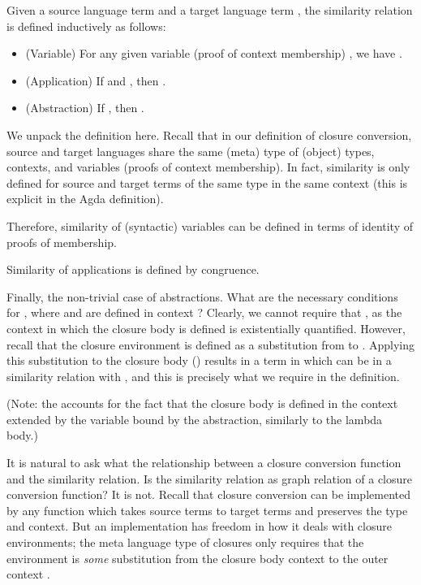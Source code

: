 \begin{definition}
  Given a source language term  and a target language term ,
  the similarity relation  is defined inductively as
  follows:

  \begin{itemize}
  \item
    (Variable) For any given variable (proof of context membership) , we have
    .

  \item
    (Application) If  and ,
    then .

  \item
    (Abstraction) If ,
    then .
  \end{itemize}
\end{definition}

We unpack the definition here. Recall that in our definition of
closure conversion, source and target languages share the same (meta)
type of (object) types, contexts, and variables (proofs of context
membership). In fact, similarity is only defined for source and target
terms of the same type in the same context (this is explicit in the Agda
definition). 

Therefore, similarity of (syntactic) variables can be defined in terms
of identity of proofs of membership.

Similarity of applications is defined by congruence.

Finally, the non-trivial case of abstractions. What are the necessary
conditions for , where  and 
 are defined in context ? Clearly, we cannot require
that , as the context  in which the closure body is
defined is existentially quantified. However, recall that the closure environment
 is defined as a substitution from  to . Applying
this substitution to the closure body ()
results in a term in  which can be in a similarity relation with
, and this is precisely what we require in the definition.

(Note: the  accounts for the fact that the closure body is
defined in the context  extended by the variable bound by the
abstraction, similarly to the lambda body.)

It is natural to ask what the relationship between a closure
conversion function and the similarity relation. Is the similarity
relation as graph relation of a closure conversion function? It is
not. Recall that closure conversion can be implemented by any function
which takes source terms to target terms and preserves the type and
context. But an implementation has freedom in how it deals with
closure environments; the meta language type of closures only requires
that the environment is \textit{some} substitution from the closure
body context  to the outer context .

